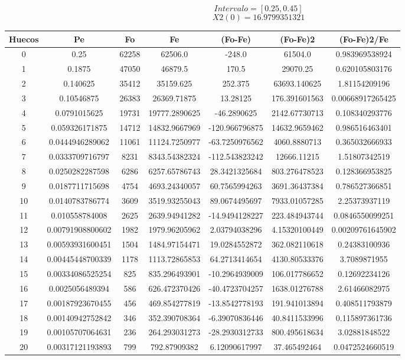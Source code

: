 \documentclass{article}
\begin{document}
$$
Intervalo = [0.25, 0.45]
$$
$$
X2(0) = 16.9799351321
$$
\begin{tabular}{|c|c|c|c|c|c|c|}
Huecos&Pe&Fo&Fe&(Fo{-}Fe)&(Fo{-}Fe)2&(Fo{-}Fe)2/Fe\\
\hline
0&0.25&62258&62506.0&{-}248.0&61504.0&0.983969538924\\
\hline
1&0.1875&47050&46879.5&170.5&29070.25&0.620105803176\\
\hline
2&0.140625&35412&35159.625&252.375&63693.140625&1.81154209196\\
\hline
3&0.10546875&26383&26369.71875&13.28125&176.391601563&0.00668917265425\\
\hline
4&0.0791015625&19731&19777.2890625&{-}46.2890625&2142.67730713&0.108340293776\\
\hline
5&0.059326171875&14712&14832.9667969&{-}120.966796875&14632.9659462&0.986516463401\\
\hline
6&0.0444946289062&11061&11124.7250977&{-}63.7250976562&4060.8880713&0.365032666933\\
\hline
7&0.0333709716797&8231&8343.54382324&{-}112.543823242&12666.11215&1.51807342519\\
\hline
8&0.0250282287598&6286&6257.65786743&28.3421325684&803.276478523&0.128366953825\\
\hline
9&0.0187711715698&4754&4693.24340057&60.7565994263&3691.36437384&0.786527366851\\
\hline
10&0.0140783786774&3609&3519.93255043&89.0674495697&7933.01057285&2.25373937119\\
\hline
11&0.010558784008&2625&2639.94941282&{-}14.9494128227&223.484943744&0.0846550099251\\
\hline
12&0.00791908800602&1982&1979.96205962&2.03794038296&4.15320100449&0.00209761645902\\
\hline
13&0.00593931600451&1504&1484.97154471&19.0284552872&362.082110618&0.24383100936\\
\hline
14&0.00445448700339&1178&1113.72865853&64.2713414654&4130.80533376&3.7089871955\\
\hline
15&0.00334086525254&825&835.296493901&{-}10.2964939009&106.017786652&0.12692234126\\
\hline
16&0.0025056489394&586&626.472370426&{-}40.4723704257&1638.01276788&2.61466082975\\
\hline
17&0.00187923670455&456&469.854277819&{-}13.8542778193&191.941013894&0.408511793879\\
\hline
18&0.00140942752842&346&352.390708364&{-}6.39070836446&40.8411533996&0.115897361736\\
\hline
19&0.00105707064631&236&264.293031273&{-}28.2930312733&800.495618634&3.02881848522\\
\hline
20&0.00317121193893&799&792.87909382&6.12090617997&37.465492464&0.0472524660519\\
\end{tabular}
\end{document}
